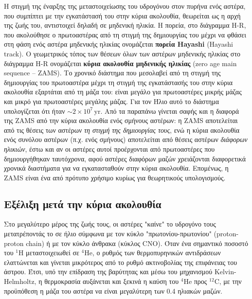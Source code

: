 Η στιγμή της έναρξης της μεταστοιχείωσης του υδρογόνου στον πυρήνα ενός αστέρα, που συμπίπτει με την εγκατάστασή του στην κύρια ακολουθία, θεωρείται ως η αρχή της ζωής του, αντιστοιχεί δηλαδή σε μηδενική ηλικία. Η πορεία, στο διάγραμμα H-R, που ακολούθησε ο πρωτοαστέρας από τη στιγμή της δημιουργίας του μέχρι να φθάσει στη φάση ενός αστέρα μηδενικής ηλικίας ονομάζεται \textbf{πορεία Hayashi} (Hayashi track). Ο γεωμετρικός τόπος των θέσεων όλων των αστέρων μηδενικής ηλικίας στο διάγραμμα H-R ονομάζεται \textbf{κύρια ακολουθία μηδενικής ηλικίας} (zero age main sequence -- ZAMS). Το χρονικό διάστημα που μεσολαβεί από τη στιγμή της δημιουργίας του πρωτοαστέρα μέχρι τη στιγμή της εγκατάστασής του στην κύρια ακολουθία εξαρτάται από τη μάζα του: είναι μεγάλο για πρωτοαστέρες μικρής μάζας και μικρό για πρωτοαστέρες μεγάλης μάζας. Για τον Ήλιο αυτό το διάστημα υπολογίζεται ότι ήταν $\sim 2 \times 10^7 \,\text{yr}$. Από τα παραπάνω γίνεται σαφής και η διαφορά της ZAMS από την κύρια ακολουθία ενός σμήνους αστέρων: η ZAMS αποτελείται από τις θέσεις των αστέρων \textit{τη στιγμή της δημιουργίας τους}, ενώ η κύρια ακολουθία ενός συνόλου αστέρων (π.χ. ενός σμήνους) αποτελείται από θέσεις αστέρων \textit{διάφορων ηλικιών}, έστω και αν οι αστέρες αυτοί προέρχονται από πρωτοαστέρες που δημιουργήθηκαν ταυτόχρονα, αφού αστέρες διαφόρων μαζών χρειάζονται διαφορετικά χρονικά διαστήματα για να εγκατασταθούν στην κύρια ακολουθία. Επομένως, η ZAMS είναι ένα από πρότυπο χρήσιμο κυρίως για θεωρητικούς υπολογισμούς.
\subsection{Εξέλιξη μετά την κύρια ακολουθία}
Στο μεγαλύτερο μέρος της ζωής τους, οι αστέρες "καίνε" το υδρογόνο τους μετατρέποντάς το σε ήλιο σύμφωνα με τον κύκλο "πρωτονίου-πρωτονίου" (proton-proton chain) ή με τον κύκλο άνθρακα (κύκλος CNO). Όταν ένα σημαντικό ποσοστό του $^1$H μεταστοιχειωθεί σε $^4$He, ο ρυθμός των θερμοπυρηνικών αντιδράσεων ελαττώνεται και γίνεται μικρότερος από το ρυθμό ακτινοβολίας της επιφάνειας του άστρου. Έτσι, υπό την επίδραση της βαρύτητας και μέσω του μηχανισμού Kelvin-Helmholtz, η θερμοκρασία αυξάνεται και ξεκινά  η καύση του $^4$He προς $^{12}$C, με την προϋπόθεση η μάζα του αστέρα να είναι μεγαλύτερη των 0.4 ηλιακών μαζών.

